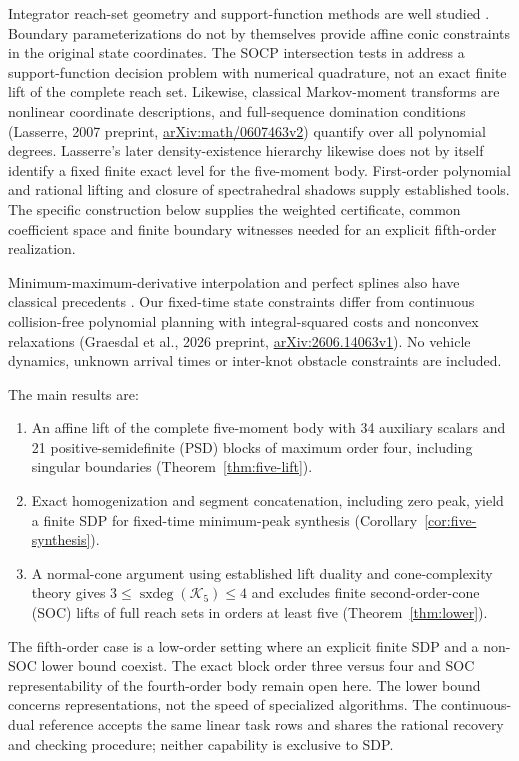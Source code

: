\documentclass[pdflatex,sn-mathphys-num]{sn-jnl}
\theoremstyle{thmstyleone}
\theoremstyle{thmstyletwo}\newtheorem{remark}[theorem]{Remark}
\newcommand{\K}{\mathcal K}
\newcommand{\sxdeg}{\operatorname{sxdeg}}
\begin{document}
Integrator reach-set geometry and support-function methods are well studied
\cite{hh,intersection}. Boundary parameterizations do not by themselves provide
affine conic constraints in the original state coordinates. The SOCP intersection
tests in \cite{intersection} address a support-function decision problem with
numerical quadrature, not an exact finite lift of the complete reach set.
Likewise, classical
Markov-moment transforms \cite{gr} are nonlinear coordinate descriptions, and
full-sequence domination conditions (Lasserre, 2007 preprint,
\href{https://arxiv.org/abs/math/0607463v2}{arXiv:math/0607463v2})
quantify over all polynomial degrees. Lasserre's later density-existence
hierarchy \cite{lasserredensity} likewise does not by itself identify a fixed
finite exact level for the five-moment body. First-order polynomial and rational lifting
\cite{nie,nierational} and closure of spectrahedral shadows \cite{gn} supply
established tools. The specific construction below supplies the weighted
certificate, common coefficient space and finite boundary witnesses needed
for an explicit fifth-order realization.

Minimum-maximum-derivative interpolation and perfect splines also have
classical precedents \cite{mcclure}. Our fixed-time state constraints differ
from continuous collision-free polynomial planning with integral-squared costs
and nonconvex relaxations (Graesdal et al., 2026 preprint,
\href{https://arxiv.org/abs/2606.14063v1}{arXiv:2606.14063v1}). No vehicle dynamics, unknown arrival
times or inter-knot obstacle constraints are included.

The main results are:
\begin{enumerate}
\item An affine lift of the complete five-moment body with 34 auxiliary
scalars and 21 positive-semidefinite (PSD) blocks of maximum order four,
including singular boundaries (Theorem~\ref{thm:five-lift}).
\item Exact homogenization and segment concatenation, including zero peak,
yield a finite SDP for fixed-time minimum-peak synthesis
(Corollary~\ref{cor:five-synthesis}).
\item A normal-cone argument using established lift duality \cite{gpt} and
cone-complexity theory \cite{averkov} gives
$3\le\sxdeg(\K_5)\le4$ and excludes finite second-order-cone (SOC) lifts
of full reach sets in orders at least five (Theorem~\ref{thm:lower}).
\end{enumerate}
The fifth-order case is a low-order setting where an explicit finite SDP
and a non-SOC lower bound coexist. The exact block order three versus four
and SOC representability of the fourth-order body remain open here.
The lower bound concerns representations, not the speed of specialized
algorithms. The continuous-dual reference accepts the same linear task rows
and shares the rational recovery and checking procedure; neither capability
is exclusive to SDP.
\end{document}
